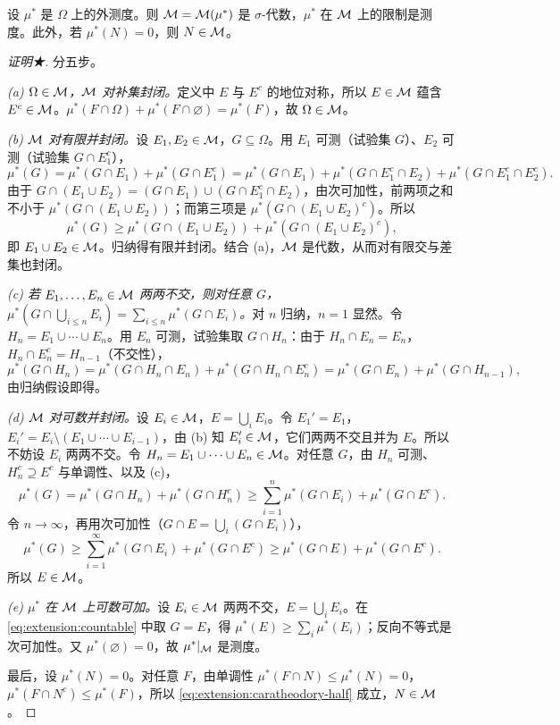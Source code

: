 \begin{theorem}[Carathéodory 定理]\label{thm:extension:caratheodory}
设 $\mu^*$ 是 $\Omega$ 上的外测度。则 $\mathcal{M}=\mathcal{M}(\mu^*)$ 是 $\sigma$-代数，$\mu^*$ 在 $\mathcal{M}$ 上的限制是测度。此外，若 $\mu^*(N)=0$，则 $N\in\mathcal{M}$。
\end{theorem}
\begin{proof}[证明★]
分五步。

\emph{(a) $\Omega\in\mathcal{M}$，$\mathcal{M}$ 对补集封闭。}定义中 $E$ 与 $E^c$ 的地位对称，所以 $E\in\mathcal{M}$ 蕴含 $E^c\in\mathcal{M}$。$\mu^*(F\cap\Omega)+\mu^*(F\cap\varnothing)=\mu^*(F)$，故 $\Omega\in\mathcal{M}$。

\emph{(b) $\mathcal{M}$ 对有限并封闭。}设 $E_1,E_2\in\mathcal{M}$，$G\subseteq\Omega$。用 $E_1$ 可测（试验集 $G$）、$E_2$ 可测（试验集 $G\cap E_1^c$），
\[
\mu^*(G)=\mu^*(G\cap E_1)+\mu^*(G\cap E_1^c)=\mu^*(G\cap E_1)+\mu^*(G\cap E_1^c\cap E_2)+\mu^*(G\cap E_1^c\cap E_2^c).
\]
由于 $G\cap(E_1\cup E_2)=(G\cap E_1)\cup(G\cap E_1^c\cap E_2)$，由次可加性，前两项之和不小于 $\mu^*(G\cap(E_1\cup E_2))$；而第三项是 $\mu^*(G\cap(E_1\cup E_2)^c)$。所以
\[
\mu^*(G)\geqslant\mu^*(G\cap(E_1\cup E_2))+\mu^*(G\cap(E_1\cup E_2)^c),
\]
即 $E_1\cup E_2\in\mathcal{M}$。归纳得有限并封闭。结合 (a)，$\mathcal{M}$ 是代数，从而对有限交与差集也封闭。

\emph{(c) 若 $E_1,\dots,E_n\in\mathcal{M}$ 两两不交，则对任意 $G$，$\mu^*(G\cap\bigcup_{i\leqslant n}E_i)=\sum_{i\leqslant n}\mu^*(G\cap E_i)$。}对 $n$ 归纳，$n=1$ 显然。令 $H_n=E_1\cup\cdots\cup E_n$。用 $E_n$ 可测，试验集取 $G\cap H_n$：由于 $H_n\cap E_n=E_n$，$H_n\cap E_n^c=H_{n-1}$（不交性），
\[
\mu^*(G\cap H_n)=\mu^*(G\cap H_n\cap E_n)+\mu^*(G\cap H_n\cap E_n^c)=\mu^*(G\cap E_n)+\mu^*(G\cap H_{n-1}),
\]
由归纳假设即得。

\emph{(d) $\mathcal{M}$ 对可数并封闭。}设 $E_i\in\mathcal{M}$，$E=\bigcup_iE_i$。令 $E_1'=E_1$，$E_i'=E_i\setminus(E_1\cup\cdots\cup E_{i-1})$，由 (b) 知 $E_i'\in\mathcal{M}$，它们两两不交且并为 $E$。所以不妨设 $E_i$ 两两不交。令 $H_n=E_1\cup\cdots\cup E_n\in\mathcal{M}$。对任意 $G$，由 $H_n$ 可测、$H_n^c\supseteq E^c$ 与单调性、以及 (c)，
\[
\mu^*(G)=\mu^*(G\cap H_n)+\mu^*(G\cap H_n^c)\geqslant\sum_{i=1}^n\mu^*(G\cap E_i)+\mu^*(G\cap E^c).
\]
令 $n\to\infty$，再用次可加性（$G\cap E=\bigcup_i(G\cap E_i)$），
\begin{equation}\label{eq:extension:countable}
\mu^*(G)\geqslant\sum_{i=1}^\infty\mu^*(G\cap E_i)+\mu^*(G\cap E^c)\geqslant\mu^*(G\cap E)+\mu^*(G\cap E^c).
\end{equation}
所以 $E\in\mathcal{M}$。

\emph{(e) $\mu^*$ 在 $\mathcal{M}$ 上可数可加。}设 $E_i\in\mathcal{M}$ 两两不交，$E=\bigcup_iE_i$。在 \eqref{eq:extension:countable} 中取 $G=E$，得 $\mu^*(E)\geqslant\sum_i\mu^*(E_i)$；反向不等式是次可加性。又 $\mu^*(\varnothing)=0$，故 $\mu^*|_{\mathcal{M}}$ 是测度。

最后，设 $\mu^*(N)=0$。对任意 $F$，由单调性 $\mu^*(F\cap N)\leqslant\mu^*(N)=0$，$\mu^*(F\cap N^c)\leqslant\mu^*(F)$，所以 \eqref{eq:extension:caratheodory-half} 成立，$N\in\mathcal{M}$。
\end{proof}

